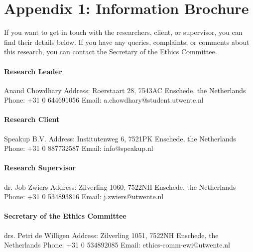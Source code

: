 \documentclass{article}
\begin{document}
\newpage

\cleardoublepage
{}
\setcounter{page}{\thesavepage}

\section*{Appendix 1: Information Brochure}

If you want to get in touch with the researchers, client, or supervisor, you can find their details below. If you have any queries, complaints, or comments about this research, you can contact the Secretary of the Ethics Committee.

\paragraph{Research Leader}
Anand Chowdhary\newline
Address: Roerstaart 28, 7543AC Enschede, the Netherlands\newline
Phone: +31 0 644691056\newline
Email: a.chowdhary@student.utwente.nl

\paragraph{Research Client}
Speakup B.V.\newline
Address: Institutenweg 6, 7521PK Enschede, the Netherlands\newline
Phone: +31 0 887732587\newline
Email: info@speakup.nl

\paragraph{Research Supervisor}
dr. Job Zwiers\newline
Address: Zilverling 1060, 7522NH Enschede, the Netherlands\newline
Phone: +31 0 534893816\newline
Email: j.zwiers@utwente.nl

\paragraph{Secretary of the Ethics Committee}
drs. Petri de Willigen\newline
Address: Zilverling 1051, 7522NH Enschede, the Netherlands\newline
Phone: +31 0 534892085\newline
Email: ethics-comm-ewi@utwente.nl
\end{document}
